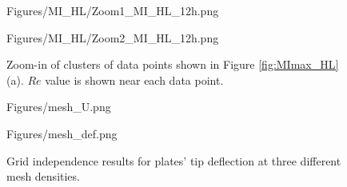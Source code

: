 \documentclass[reprint,a4paper,fleqn]{cas-dc} %
\begin{document}
		
		\begin{figure}[h]
			\begin{center}
				\begin{minipage}[c]{0.48\linewidth}
					\begin{overpic}[width=1\linewidth,trim=0.5cm 0cm 0cm 0cm,clip]{Figures/MI_HL/Zoom1_MI_HL_12h.png}
					\end{overpic}
				\end{minipage}
				\begin{minipage}[c]{0.48\linewidth}
					\begin{overpic}[width=1\linewidth,trim=0.5cm 0cm 0cm 0cm,clip]{Figures/MI_HL/Zoom2_MI_HL_12h.png}
					\end{overpic}
				\end{minipage}\vspace{0cm}
			\end{center}
			\caption{Zoom-in of clusters of data points shown in Figure \ref{fig:MImax_HL}(a). $Re$ value is shown near each data point.}
			\label{fig:MImax_HL2_zoom}
		\end{figure}
		
						
		\begin{figure}[h]
			\begin{center}
				\begin{minipage}[c]{0.55\linewidth}
					\begin{overpic}[width=1\linewidth,trim=0cm 0cm 0cm 0cm,clip]{Figures/mesh_U.png}
					\end{overpic}
				\end{minipage}
				\begin{minipage}[c]{0.4\linewidth}
					\begin{overpic}[width=1\linewidth,trim=0cm 0cm 0cm 0cm,clip]{Figures/mesh_def.png}
					\end{overpic}
				\end{minipage}\vspace{0cm}
			\end{center}
			\caption{Grid independence results for plates' tip deflection at three different mesh densities.}
			\label{fig:grid}
		\end{figure}
		
		
		
		
	
\end{document}
